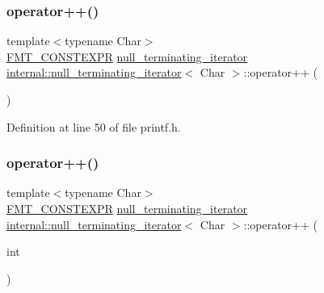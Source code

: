 \subsubsection{\texorpdfstring{operator++()}{operator++()}\hspace{0.1cm}{\footnotesize\ttfamily [1/2]}}
{\footnotesize\ttfamily template$<$typename Char$>$ \\
\hyperlink{core_8h_a69201cb276383873487bf68b4ef8b4cd}{F\+M\+T\+\_\+\+C\+O\+N\+S\+T\+E\+X\+PR} \hyperlink{classinternal_1_1null__terminating__iterator}{null\+\_\+terminating\+\_\+iterator} \hyperlink{classinternal_1_1null__terminating__iterator}{internal\+::null\+\_\+terminating\+\_\+iterator}$<$ Char $>$\+::operator++ (\begin{DoxyParamCaption}{ }\end{DoxyParamCaption})\hspace{0.3cm}{\ttfamily [inline]}}



Definition at line 50 of file printf.\+h.

\mbox{\label{classinternal_1_1null__terminating__iterator_afc2f529ea18a6aea67361213ee48a74d}} 
\subsubsection{\texorpdfstring{operator++()}{operator++()}\hspace{0.1cm}{\footnotesize\ttfamily [2/2]}}
{\footnotesize\ttfamily template$<$typename Char$>$ \\
\hyperlink{core_8h_a69201cb276383873487bf68b4ef8b4cd}{F\+M\+T\+\_\+\+C\+O\+N\+S\+T\+E\+X\+PR} \hyperlink{classinternal_1_1null__terminating__iterator}{null\+\_\+terminating\+\_\+iterator} \hyperlink{classinternal_1_1null__terminating__iterator}{internal\+::null\+\_\+terminating\+\_\+iterator}$<$ Char $>$\+::operator++ (\begin{DoxyParamCaption}\item[{int}]{ }\end{DoxyParamCaption})\hspace{0.3cm}{\ttfamily [inline]}}



